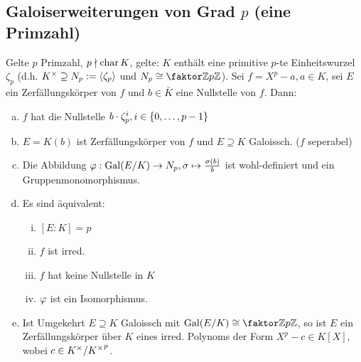 \documentclass[a4paper]{report}
\begin{document}
\subsection{Galoiserweiterungen von Grad $p$ (eine Primzahl)}
\begin{satz}[Kummererweiterungen] Gelte $p$ Primzahl, $p \nmid \operatorname{char} K$, gelte: $K$ enthält eine primitive $p$-te Einheitswurzel $\zeta_{p}$ (d.h. $K^\times \supseteq N_{p}:= \langle\zeta_{p}\rangle$ und $N_{p} \cong \fak \Z{p\Z}$). Sei $f = X^{p} - a, a \in K$, sei $E$ ein Zerfällungskörper von $f$ und $b \in \bar K$ eine Nullstelle von $f$. Dann:
  \begin{enumerate}[(a)]
    \item $f$ hat die Nullstelle $b \cdot \zeta_{p}^{i}, i \in \{0, \ldots, p-1\}$
    \item $E = K(b)$ ist Zerfällungskörper von $f$ und $E \supseteq K$ Galoissch. ($f$ seperabel)
    \item Die Abbildung $\varphi: \operatorname{Gal}(E/K) \to N_{p}, \sigma \mapsto \frac{\sigma(b)}b$ ist wohl-definiert und ein Gruppenmonomorphismus.
    \item Es sind äquivalent:
          \begin{enumerate}[(i)]
            \item $[E:K] = p$
            \item $f$ ist irred.
            \item $f$ hat keine Nullstelle in $K$
            \item $\varphi$ ist ein Isomorphismus.
          \end{enumerate}
\item Ist Umgekehrt $E \supseteq K$ Galoissch mit $\Gal(E/K) \cong\fak \Z{p\Z}$, so ist $E$ ein Zerfällungskörper über $K$ eines irred. Polynoms der Form $X^{p} - c \in K[X]$, wobei $c \in K^\times / {K^\times}^{p}$.
  \end{enumerate}
\end{satz}
\end{document}
